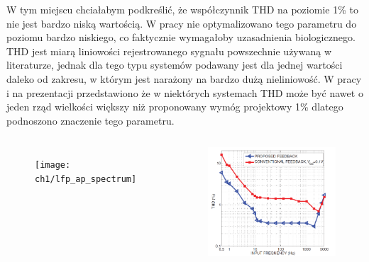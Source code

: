 \begin{frame}[t]
    \vspace{-1em}

\begin{block}{\dk}
\end{block}

{\renewcommand\normalsize{\scriptsize}%
\normalsize
W tym miejscu chciałabym podkreślić, że współczynnik THD na poziomie 1\% to nie jest bardzo niską wartością. W pracy nie optymalizowano tego parametru do poziomu bardzo niskiego, co faktycznie wymagałoby uzasadnienia biologicznego. THD jest miarą liniowości rejestrowanego sygnału powszechnie używaną w literaturze, jednak dla tego typu systemów podawany jest dla jednej wartości daleko od zakresu, w którym jest narażony na bardzo dużą nieliniowość. W pracy i na prezentacji przedstawiono że w niektórych systemach THD może być nawet o jeden rząd wielkości większy niż proponowany wymóg projektowy 1\% dlatego podnoszono znaczenie tego parametru.


}

\begin{columns}

 

    \begin{figure}[H]
        \centering
        \texttt{[image: ch1/lfp\_ap\_spectrum]}  
        \end{figure}	
    \begin{figure}[H]
        \centering
        \includegraphics[scale=0.17]{Figures/genovTHD.png}


\end{figure}
\end{columns}
\end{frame}
